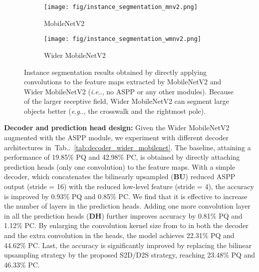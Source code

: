 \documentclass[10pt,twocolumn,letterpaper]{article}
\makeatletter
\def\@onedot{\ifx\@let@token.\else.\null\fi\xspace}
\DeclareRobustCommand\onedot{\futurelet\@let@token\@onedot}
\newcommand{\tabref}[1]{Tab\onedot~\ref{#1}}
\def\eg{\emph{e.g}\onedot} \def\Eg{\emph{E.g}\onedot}
\def\ie{\emph{i.e}\onedot} \def\Ie{\emph{I.e}\onedot}
\makeatother
\begin{document}
\begin{figure}
     \centering
     \begin{subfigure}[b]{0.2\textwidth}
         \centering
         \texttt{[image: fig/instance\_segmentation\_mnv2.png]}
         \caption{MobileNetV2}
         \label{fig:instance_mnv2}
     \end{subfigure} 
     \hfill
     \begin{subfigure}[b]{0.2\textwidth}
         \centering
         \texttt{[image: fig/instance\_segmentation\_wmnv2.png]}
         \caption{Wider MobileNetV2}
         \label{fig:instance_wmnv2}
     \end{subfigure}
        \caption{Instance segmentation results obtained by directly applying  convolutions to the feature maps extracted by MobileNetV2 and Wider MobileNetV2 (\ie, no ASPP or any other modules). Because of the larger receptive field, Wider MobileNetV2 can segment large objects better (\eg, the crosswalk and the rightmost pole).}
        \label{fig:visual_mnv2_wmnv2}
\end{figure}

{\bf Decoder and prediction head design:} Given the Wider MobileNetV2 augmented with the ASPP module, we experiment with different decoder architectures in~\tabref{tab:decoder_wider_mobilenet}. The baseline, attaining a performance of 19.85\% PQ and 42.98\% PC, is obtained by directly attaching prediction heads (only one  convolution) to the feature maps. With a simple decoder, which concatenates the bilinearly upsampled (\textbf{BU}) reduced ASPP output (stride = 16) with the reduced low-level feature (stride = 4), the accuracy is improved by 0.93\% PQ and 0.85\% PC. We find that it is effective to increase the number of layers in the prediction heads. Adding one more  convolution layer in all the prediction heads ({\bf DH}) further improves accuracy by 0.81\% PQ and 1.12\% PC. By enlarging the convolution kernel size from  to  in both the decoder and the extra convolution in the heads, the model achieves 22.31\% PQ and 44.62\% PC. Last, the accuracy is significantly improved by replacing the bilinear upsampling strategy by the proposed S2D/D2S strategy, reaching 23.48\% PQ and 46.33\% PC.
\end{document}
